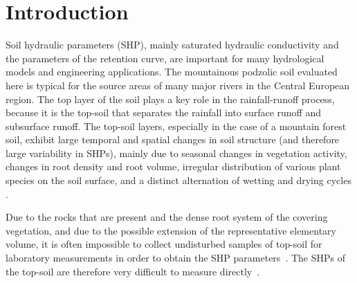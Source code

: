 \documentclass[review]{myarticle}
\begin{document}
\linenumbers

\section{Introduction}%

Soil hydraulic parameters (SHP), mainly saturated hydraulic conductivity and the parameters of the retention curve, are important for many hydrological models and engineering applications.  The mountainous podzolic soil evaluated here is typical for the source areas of many major rivers in the Central European region. The top layer of the soil plays a key role in the rainfall-runoff process, because it is the top-soil that separates the rainfall into surface runoff and subsurface runoff. The top-soil layers, especially in the case of a mountain forest soil, exhibit large temporal and spatial changes in soil structure (and therefore large variability in SHPs), mainly due to seasonal changes in vegetation activity, changes in root density and root volume, irregular distribution of various plant species on the soil surface, and a distinct alternation of wetting and drying cycles \citep{Fodor,Schwen, Leij, Mubarak}.



Due to the rocks that are present and the dense root system of the covering vegetation, and due to the possible extension of the representative elementary volume, it is often impossible to collect undisturbed samples of top-soil for laboratory measurements in order to obtain the SHP parameters~\citep{Jacka1}. The SHPs of the top-soil are therefore very difficult to measure directly~\citep{Fodor, Jacka1}. 
\end{document}

